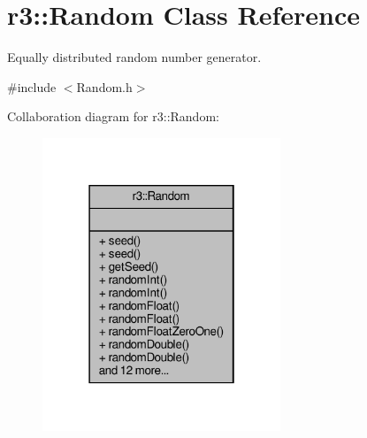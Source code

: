 \hypertarget{classr3_1_1_random}{}\section{r3\+:\+:Random Class Reference}
\label{classr3_1_1_random}


Equally distributed random number generator.  




{\ttfamily \#include $<$Random.\+h$>$}



Collaboration diagram for r3\+:\+:Random\+:\nopagebreak
\begin{figure}[H]
\begin{center}
\leavevmode
\includegraphics[width=202pt]{classr3_1_1_random__coll__graph}
\end{center}
\end{figure}
